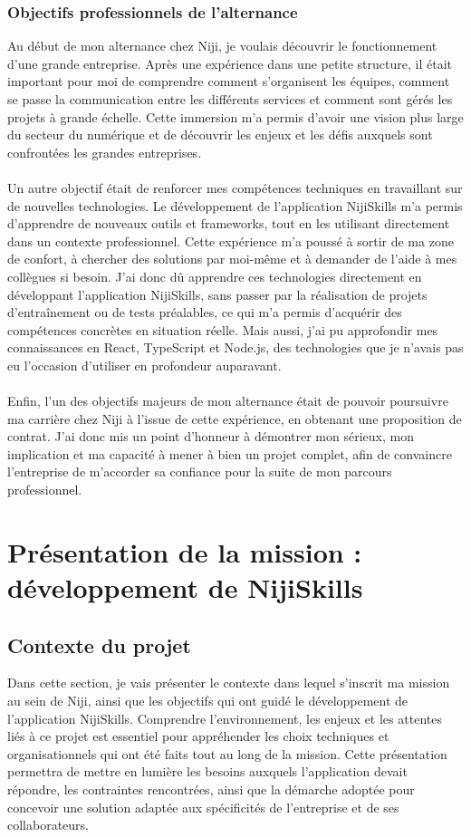 \documentclass[12pt]{article}
\begin{document}
\subsubsection{Objectifs professionnels de l’alternance}
Au début de mon alternance chez Niji, je voulais découvrir le fonctionnement d’une grande entreprise. Après une expérience dans une petite structure, il était important pour moi de comprendre comment s’organisent les équipes, comment se passe la communication entre les différents services et comment sont gérés les projets à grande échelle. Cette immersion m’a permis d’avoir une vision plus large du secteur du numérique et de découvrir les enjeux et les défis auxquels sont confrontées les grandes entreprises.
\\\\
Un autre objectif était de renforcer mes compétences techniques en travaillant sur de nouvelles technologies. Le développement de l’application NijiSkills m’a permis d’apprendre de nouveaux outils et frameworks, tout en les utilisant directement dans un contexte professionnel. Cette expérience m’a poussé à sortir de ma zone de confort, à chercher des solutions par moi-même et à demander de l’aide à mes collègues si besoin.
J'ai donc dû apprendre ces technologies directement en développant l'application NijiSkills, sans passer par la réalisation de projets d'entraînement ou de tests préalables, ce qui m'a permis d'acquérir des compétences concrètes en situation réelle.
Mais aussi, j'ai pu approfondir mes connaissances en React, TypeScript et Node.js, des technologies que je n'avais pas eu l'occasion d'utiliser en profondeur auparavant.
\\\\
Enfin, l’un des objectifs majeurs de mon alternance était de pouvoir poursuivre ma carrière chez Niji à l’issue de cette expérience, en obtenant une proposition de contrat. J’ai donc mis un point d’honneur à démontrer mon sérieux, mon implication et ma capacité à mener à bien un projet complet, afin de convaincre l’entreprise de m’accorder sa confiance pour la suite de mon parcours professionnel.
\newpage
\section{Présentation de la mission : développement de NijiSkills}
\subsection{Contexte du projet}
Dans cette section, je vais présenter le contexte dans lequel s’inscrit ma mission au sein de Niji, ainsi que les objectifs qui ont guidé le développement de l’application NijiSkills. Comprendre l’environnement, les enjeux et les attentes liés à ce projet est essentiel pour appréhender les choix techniques et organisationnels qui ont été faits tout au long de la mission. Cette présentation permettra de mettre en lumière les besoins auxquels l’application devait répondre, les contraintes rencontrées, ainsi que la démarche adoptée pour concevoir une solution adaptée aux spécificités de l’entreprise et de ses collaborateurs.
\end{document}
